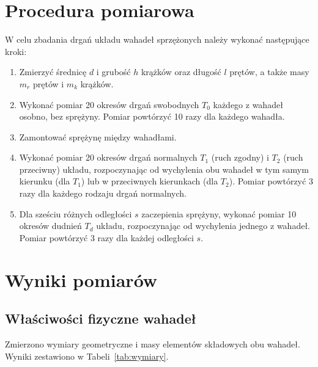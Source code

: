 \documentclass[12pt, a4paper]{article}
\begin{document}
\section{Procedura pomiarowa}
W celu zbadania drgań układu wahadeł sprzężonych należy wykonać następujące kroki:
\begin{enumerate}
    \item Zmierzyć średnicę $d$ i grubość $h$ krążków oraz długość $l$ prętów, a także masy $m_r$ prętów i $m_k$ krążków.
    \item Wykonać pomiar 20 okresów drgań swobodnych $T_0$ każdego z wahadeł osobno, bez sprężyny. Pomiar powtórzyć 10 razy dla każdego wahadła.
    \item Zamontować sprężynę między wahadłami.
    \item Wykonać pomiar 20 okresów drgań normalnych $T_1$ (ruch zgodny) i $T_2$ (ruch przeciwny) układu, rozpoczynając od wychylenia obu wahadeł w tym samym kierunku (dla $T_1$) lub w przeciwnych kierunkach (dla $T_2$). Pomiar powtórzyć 3 razy dla każdego rodzaju drgań normalnych.
    \item Dla sześciu różnych odległości $s$ zaczepienia sprężyny, wykonać pomiar 10 okresów dudnień $T_d$ układu, rozpoczynając od wychylenia jednego z wahadeł. Pomiar powtórzyć 3 razy dla każdej odległości $s$.
\end{enumerate}
\section{Wyniki pomiarów}

\subsection{Właściwości fizyczne wahadeł}

Zmierzono wymiary geometryczne i masy elementów składowych obu wahadeł.
Wyniki zestawiono w Tabeli~\ref{tab:wymiary}.
\end{document}
